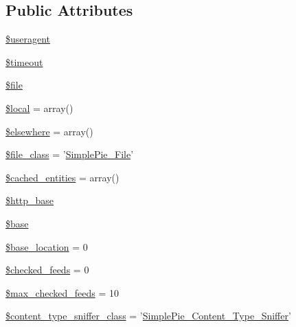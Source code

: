 \subsection*{Public Attributes}
\begin{DoxyCompactItemize}
\item 
\hyperlink{class_simple_pie___locator_ae106f9aede06885065593330914f7d12}{\$useragent}
\item 
\hyperlink{class_simple_pie___locator_ad6fdd2fb4344655b3cd8cecc73e27fc6}{\$timeout}
\item 
\hyperlink{class_simple_pie___locator_a3289ea3b35c99f0234448f5dd20b6ff3}{\$file}
\item 
\hyperlink{class_simple_pie___locator_a8aacc6eeac78a948de542d1ee1590ae8}{\$local} = array()
\item 
\hyperlink{class_simple_pie___locator_a84f7b16aca51b777bbcff583ca9f4075}{\$elsewhere} = array()
\item 
\hyperlink{class_simple_pie___locator_af5f091bdfe2335ba57e283b96e53282a}{\$file\-\_\-class} = '\hyperlink{class_simple_pie___file}{Simple\-Pie\-\_\-\-File}'
\item 
\hyperlink{class_simple_pie___locator_adf8ca5118cd141388bd55d2b5ff59509}{\$cached\-\_\-entities} = array()
\item 
\hyperlink{class_simple_pie___locator_a5993c7d5ba64b1c4312333af7bce300e}{\$http\-\_\-base}
\item 
\hyperlink{class_simple_pie___locator_a2e92a636c168c432ac2243b63909a650}{\$base}
\item 
\hyperlink{class_simple_pie___locator_a44ec5fe2a47ac83820dad5aeec91ae7e}{\$base\-\_\-location} = 0
\item 
\hyperlink{class_simple_pie___locator_aecf1455c4143100bccc71637e82cbff5}{\$checked\-\_\-feeds} = 0
\item 
\hyperlink{class_simple_pie___locator_a3becfac82d8027e819825b1d1387ad1c}{\$max\-\_\-checked\-\_\-feeds} = 10
\item 
\hyperlink{class_simple_pie___locator_a23af212e953f1bf536e20c6faa94bfc3}{\$content\-\_\-type\-\_\-sniffer\-\_\-class} = '\hyperlink{class_simple_pie___content___type___sniffer}{Simple\-Pie\-\_\-\-Content\-\_\-\-Type\-\_\-\-Sniffer}'
\end{DoxyCompactItemize}


